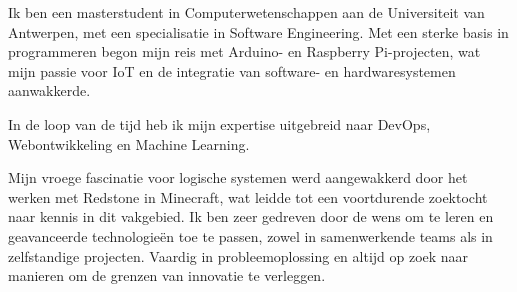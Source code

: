 

\begin{cvparagraph}

Ik ben een masterstudent in Computerwetenschappen aan de Universiteit van Antwerpen, met een specialisatie in Software Engineering. 
Met een sterke basis in programmeren begon mijn reis met Arduino- en Raspberry Pi-projecten, 
wat mijn passie voor IoT en de integratie van software- en hardwaresystemen aanwakkerde. 

In de loop van de tijd heb ik mijn expertise uitgebreid naar DevOps, Webontwikkeling en Machine Learning.

Mijn vroege fascinatie voor logische systemen werd aangewakkerd door het werken met Redstone in Minecraft, 
wat leidde tot een voortdurende zoektocht naar kennis in dit vakgebied. Ik ben zeer gedreven door de wens om te leren en geavanceerde technologieën toe te passen, 
zowel in samenwerkende teams als in zelfstandige projecten. 
Vaardig in probleemoplossing en altijd op zoek naar manieren om de grenzen van innovatie te verleggen.
\end{cvparagraph}
